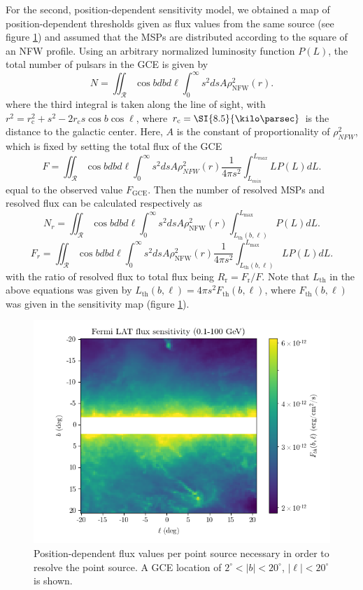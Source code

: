 \documentclass{C://Aliases//Dropbox-MIT//Latex_Templates//personal}
\begin{document}
For the second, position-dependent sensitivity model, we obtained a map of position-dependent thresholds given as flux values from the same source \cite{Fermi-LAT:2019yla, Ballet:2020hze} (see figure \ref{fig:flux-thresholds}) and assumed that the MSPs are distributed according to the square of an NFW profile. Using an arbitrary normalized luminosity function $P(L)$, the total number of pulsars in the GCE is given by 
\begin{equation}
    N = \iint_{\mathcal{R}}\cos b dbd\ell \int_0^\infty s^2 ds A \rho_\text{NFW}^2 (r).
    \label{eqn:n}
\end{equation}
where the third integral is taken along the line of sight, with $r^2 = r_\text{c}^2 + s^2 - 2r_\text{c} s \cos b \cos \ell$, where $r_\text{c} = \SI{8.5}{\kilo\parsec}$ is the distance to the galactic center. Here, $A$ is the constant of proportionality of $\rho_{NFW}^2$, which is fixed by setting the total flux of the GCE
\begin{equation}
    F = \iint_{\mathcal{R}}\cos b dbd\ell \int_0^\infty s^2 ds A \rho_{NFW}^2 (r) \frac{1}{4\pi s^2}\int_{L_{min}}^{L_{max}}LP(L)dL.
    \label{eqn:f}
\end{equation}
equal to the observed value $F_\text{GCE}$. Then the number of resolved MSPs and resolved flux can be calculated respectively as 
\begin{equation}
    N_r = \iint_{\mathcal{R}}\cos b dbd\ell \int_0^\infty s^2 ds A \rho_\text{NFW}^2 (r) \int_{L_\text{th}(b, \ell)}^{L_\text{max}}P(L)dL.
    \label{eqn:nr}
\end{equation}
\begin{equation}
    F_r = \iint_{\mathcal{R}}\cos b dbd\ell \int_0^\infty s^2 ds A \rho_\text{NFW}^2 (r) \frac{1}{4\pi s^2}\int_{L_\text{th}(b, \ell)}^{L_\text{max}}LP(L)dL.
    \label{eqn:fr}
\end{equation}
with the ratio of resolved flux to total flux being $R_\text{r} = F_\text{r}/F$. Note that $L_\text{th}$ in the above equations was given by $L_\text{th}(b, \ell) = 4\pi s^2 F_\text{th}(b, \ell)$, where $F_\text{th}(b, \ell)$ was given in the sensitivity map (figure \ref{fig:flux-thresholds}).

\begin{figure}
    \centering
    \includegraphics[width=.6\linewidth]{figs/flux-thresholds.png}
    \caption{Position-dependent flux values per point source necessary in order to resolve the point source. A GCE location of $2^\circ < |b| < 20^\circ$, $|\ell| < 20^\circ$ is shown.}
    \label{fig:flux-thresholds}
\end{figure}
\end{document}
